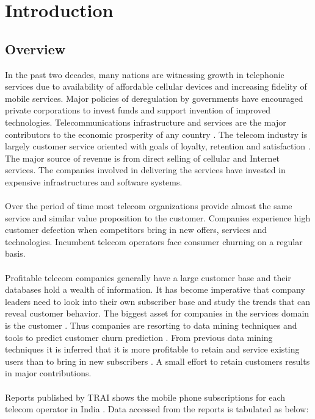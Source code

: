 \setlength{\footskip}{8mm}

\chapter{Introduction}


\section{Overview}

In the past two decades, many nations are witnessing growth in telephonic services due to  availability of affordable cellular devices and increasing fidelity of mobile services. Major policies of deregulation by governments have encouraged private corporations to invest funds and support invention of improved technologies. Telecommunications infrastructure and services are the major contributors to the economic prosperity of any country . The telecom industry is largely customer service oriented with goals of loyalty, retention and satisfaction . The major source of revenue is from direct selling of cellular and Internet services. The companies involved in delivering the services have invested in expensive infrastructures and software systems.
\\\\
Over the period of time most telecom organizations provide almost the same service and similar value proposition to the customer. Companies experience high customer defection when competitors bring in new offers, services and technologies. Incumbent telecom operators face consumer churning on a regular basis.
\\
\\
Profitable telecom companies generally have a large customer base and their databases hold a wealth of information. It has become imperative that company leaders need to look into their own subscriber base and study the trends that can reveal customer behavior. The biggest asset for companies in the services domain is the customer . Thus companies are resorting to data mining techniques and tools to predict customer churn prediction . From previous data mining techniques it is inferred that it is more profitable to retain and service existing users than to bring in new subscribers . A small effort to retain customers results in major contributions.
\\
\\
Reports published by TRAI shows the mobile phone subscriptions for each telecom operator in India . Data accessed from the reports is tabulated as below:

